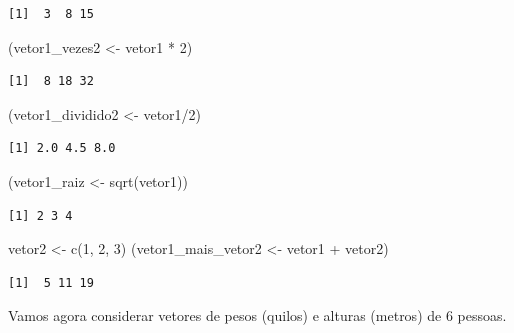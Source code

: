 \documentclass[
  letterpaper,
  DIV=11,
  numbers=noendperiod]{scrreprt}
\newenvironment{Shaded}{\begin{snugshade}}{\end{snugshade}}
\newcommand{\DecValTok}[1]{\textcolor[rgb]{0.68,0.00,0.00}{#1}}
\newcommand{\FunctionTok}[1]{\textcolor[rgb]{0.28,0.35,0.67}{#1}}
\newcommand{\NormalTok}[1]{\textcolor[rgb]{0.00,0.23,0.31}{#1}}
\newcommand{\OtherTok}[1]{\textcolor[rgb]{0.00,0.23,0.31}{#1}}
\newcommand{\SpecialCharTok}[1]{\textcolor[rgb]{0.37,0.37,0.37}{#1}}
\begin{document}
\begin{verbatim}
[1]  3  8 15
\end{verbatim}

\begin{Shaded}
\begin{Highlighting}[]
\NormalTok{(vetor1\_vezes2 }\OtherTok{\textless{}{-}}\NormalTok{ vetor1 }\SpecialCharTok{*} \DecValTok{2}\NormalTok{)}
\end{Highlighting}
\end{Shaded}

\begin{verbatim}
[1]  8 18 32
\end{verbatim}

\begin{Shaded}
\begin{Highlighting}[]
\NormalTok{(vetor1\_dividido2 }\OtherTok{\textless{}{-}}\NormalTok{ vetor1}\SpecialCharTok{/}\DecValTok{2}\NormalTok{)}
\end{Highlighting}
\end{Shaded}

\begin{verbatim}
[1] 2.0 4.5 8.0
\end{verbatim}

\begin{Shaded}
\begin{Highlighting}[]
\NormalTok{(vetor1\_raiz }\OtherTok{\textless{}{-}} \FunctionTok{sqrt}\NormalTok{(vetor1))}
\end{Highlighting}
\end{Shaded}

\begin{verbatim}
[1] 2 3 4
\end{verbatim}

\begin{Shaded}
\begin{Highlighting}[]
\NormalTok{vetor2 }\OtherTok{\textless{}{-}} \FunctionTok{c}\NormalTok{(}\DecValTok{1}\NormalTok{, }\DecValTok{2}\NormalTok{, }\DecValTok{3}\NormalTok{)}
\NormalTok{(vetor1\_mais\_vetor2 }\OtherTok{\textless{}{-}}\NormalTok{ vetor1 }\SpecialCharTok{+}\NormalTok{ vetor2)}
\end{Highlighting}
\end{Shaded}

\begin{verbatim}
[1]  5 11 19
\end{verbatim}

Vamos agora considerar vetores de pesos (quilos) e alturas (metros) de 6
pessoas.
\end{document}
